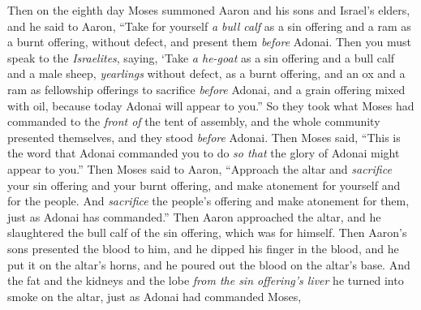\begin{biblechapter} %
 Then on the eighth day Moses summoned Aaron and his sons and Israel’s elders,
\verse and he said to Aaron, “Take for yourself \textit{a bull calf} as a sin offering and a ram as a burnt offering, without defect, and present them \textit{before} Adonai.
\verse Then you must speak to the \textit{Israelites}, saying, ‘Take \textit{a he-goat} as a sin offering and a bull calf and a male sheep, \textit{yearlings} without defect, as a burnt offering,
\verse and an ox and a ram as fellowship offerings to sacrifice \textit{before} Adonai, and a grain offering mixed with oil, because today Adonai will appear to you.”
\verse So they took what Moses had commanded to the \textit{front of} the tent of assembly, and the whole community presented themselves, and they stood \textit{before} Adonai.
\verse Then Moses said, “This is the word that Adonai commanded you to do \textit{so that} the glory of Adonai might appear to you.”
\verse Then Moses said to Aaron, “Approach the altar and \textit{sacrifice} your sin offering and your burnt offering, and make atonement for yourself and for the people. And \textit{sacrifice} the people’s offering and make atonement for them, just as Adonai has commanded.”
\verse Then Aaron approached the altar, and he slaughtered the bull calf of the sin offering, which was for himself.
\verse Then Aaron’s sons presented the blood to him, and he dipped his finger in the blood, and he put it on the altar’s horns, and he poured out the blood on the altar’s base.
\verse And the fat and the kidneys and the lobe \textit{from the sin offering’s liver} he turned into smoke on the altar, just as Adonai had commanded Moses,

\end{biblechapter}
